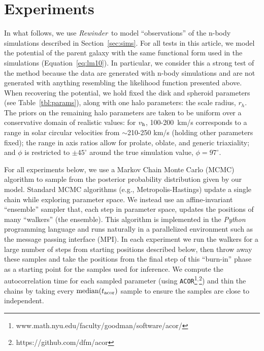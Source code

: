 \documentclass[letterpaper,12pt,preprint]{aastex}
\newcommand{\project}[1]{\textsl{#1}}
\newcommand{\vhalo}{v_{\rm h}}
\newcommand{\rewinder}{\emph{Rewinder}}
\begin{document}
\section{Experiments} \label{sec:experiments}
In what follows, we use \rewinder\, to model ``observations'' of the n-body simulations described in Section~\ref{sec:sims}. For all tests in this article, we model the potential of the parent galaxy with the same functional form used in the simulations (Equation~\ref{eq:lm10}). In particular, we consider this a strong test of the method because the data are generated with n-body simulations and are not generated with anything resembling the likelihood function presented above. When recovering the potential, we hold fixed the disk and spheroid parameters (see Table~\ref{tbl:params}), along with one halo parameters: the scale radius, $r_h$. The priors on the remaining halo parameters are taken to be uniform over a conservative domain of realistic values: for $\vhalo$, 100-200~km/s corresponds to a range in solar circular velocities from $\sim$210-250 km/s (holding other parameters fixed); the range in axis ratios allow for prolate, oblate, and generic triaxiality; and $\phi$ is restricted to $\pm45^\circ$ around the true simulation value, $\phi = 97^\circ$.

For all experiments below, we use a Markov Chain Monte Carlo (MCMC) algorithm to sample from the posterior probability distribution given by our model. Standard MCMC algorithms (e.g., Metropolis-Hastings) update a single chain while exploring parameter space. We instead use an affine-invariant ``ensemble'' sampler \citep{goodman10} that, each step in parameter space, updates the positions of many ``walkers'' (the ensemble). This algorithm is implemented in the \project{Python} programming language \citep{foremanmackey13} and runs naturally in a parallelized environment such as the message passing interface (MPI). In each experiment we run the walkers for a large number of steps from starting positions described below, then throw away these samples and take the positions from the final step of this ``burn-in'' phase as a starting point for the samples used for inference. We compute the autocorrelation time for each sampled parameter (using \texttt{ACOR}\footnote{www.math.nyu.edu/faculty/goodman/software/acor/}$^{,}$\footnote{https://github.com/dfm/acor}) and thin the chains by taking every $\mathrm{median}(t_{\rm acor})$ sample to ensure the samples are close to independent.
\end{document}
